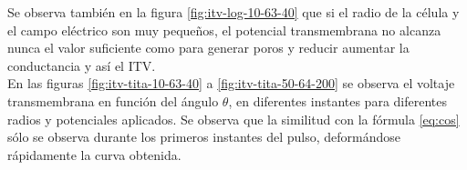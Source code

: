 \documentclass[a4paper,10pt]{article}
\begin{document}
Se observa también en la figura \ref{fig:itv-log-10-63-40} que si el radio de la célula y el campo eléctrico son muy pequeños, el potencial transmembrana no alcanza nunca el valor suficiente como para generar poros y reducir aumentar la conductancia y así el ITV.\\

En las figuras \ref{fig:itv-tita-10-63-40} a \ref{fig:itv-tita-50-64-200} se observa el voltaje transmembrana en función del ángulo $\theta$, en diferentes instantes para diferentes radios y potenciales aplicados. Se observa que la similitud con la fórmula \ref{eq:cos} sólo se observa durante los primeros instantes del pulso, deformándose rápidamente la curva obtenida.

\clearpage




\newcommand{\itvLogDoble}[6]{
\begin{figure}
	\makebox[\textwidth][c] {
		\centering
		\begin{minipage}[!h]{.45\paperwidth}
			\centering
			\texttt{[image: itv-time-log-\#1-\#2-\#3KVm]}
			\caption{ITV durante el pulso para E=#3KV/m y $\alpha$=#1$\mu$m (escala logarítmica)}
			\label{fig:itv-log-#1-#2-#3}			
		\end{minipage}\hfill
		
		\begin{minipage}[!h]{.45\paperwidth}
			\centering
			\texttt{[image: itv-time-log-\#4-\#5-\#6KVm]}
			\caption{ITV durante el pulso para E=#6KV/m y $\alpha$=#4$\mu$m (escala logarítmica)}
			\label{fig:itv-log-#4-#5-#6}			
		\end{minipage}\hfill
	}
\end{figure}
}

%
%
\end{document}
